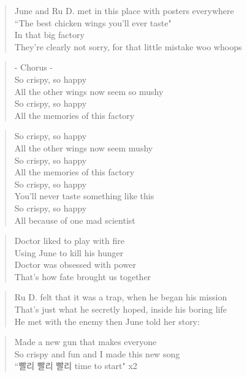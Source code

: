 \begin{verse}
June and Ru D. met in this place with posters everywhere\\
``The best chicken wings you'll ever taste"\\
In that big factory \\
They're clearly not sorry, for that little mistake woo whoops
\end{verse}

\begin{verse}
- Chorus -\\
So crispy, so happy\\
All the other wings now seem so mushy\\
So crispy, so happy\\
All the memories of this factory
\end{verse}

\begin{verse}
So crispy, so happy\\
All the other wings now seem mushy\\
So crispy, so happy\\
All the memories of this factory\\
So crispy, so happy\\
You'll never taste something like this\\
So crispy, so happy\\
All because of one mad scientist
\end{verse}

\begin{verse}
Doctor liked to play with fire\\
Using June to kill his hunger\\
Doctor was obsessed with power\\
That's how fate brought us together
\end{verse}

\begin{verse}
Ru D. felt that it was a trap, when he began his mission\\
That's just what he secretly hoped, inside his boring life\\
He met with the enemy then June told her story:
\end{verse}

\clearpage
{}

\begin{verse}
Made a new gun that makes everyone\\
So crispy and fun and I made this new song\\
``빨리 \ks 빨리 \ks 빨리 \ks time to start" x2
\end{verse}

